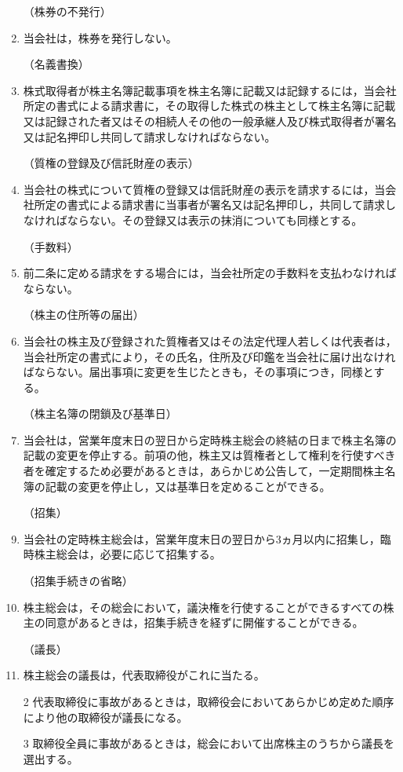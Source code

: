\documentclass[11pt,a4paper]{jsarticle}
\makeatletter
\def\section{\@startsection{section}{1}{-40pt}{15pt}{10pt}{\normalfont\Large\bfseries\centering}}
\newcommand{\header}[1]{\vspace{5pt}\hspace{-42pt}（{#1}）}
\makeatother
\begin{document}
\begin{enumerate}
\header{株券の不発行}
\item 当会社は，株券を発行しない。

\header{名義書換}
\item 株式取得者が株主名簿記載事項を株主名簿に記載又は記録するには，当会社所定の書式による請求書に，その取得した株式の株主として株主名簿に記載又は記録された者又はその相続人その他の一般承継人及び株式取得者が署名又は記名押印し共同して請求しなければならない。

\header{質権の登録及び信託財産の表示}
\item 当会社の株式について質権の登録又は信託財産の表示を請求するには，当会社所定の書式による請求書に当事者が署名又は記名押印し，共同して請求しなければならない。その登録又は表示の抹消についても同様とする。

\header{手数料}
\item 前二条に定める請求をする場合には，当会社所定の手数料を支払わなければならない。

\header{株主の住所等の届出}
\item 当会社の株主及び登録された質権者又はその法定代理人若しくは代表者は，当会社所定の書式により，その氏名，住所及び印鑑を当会社に届け出なければならない。届出事項に変更を生じたときも，その事項につき，同様とする。

\header{株主名簿の閉鎖及び基準日}
\item 当会社は，営業年度末日の翌日から定時株主総会の終結の日まで株主名簿の記載の変更を停止する。前項の他，株主又は質権者として権利を行使すべき者を確定するため必要があるときは，あらかじめ公告して，一定期間株主名簿の記載の変更を停止し，又は基準日を定めることができる。


\section{株主総会}


\item[]
\header{招集}
\item 当会社の定時株主総会は，営業年度末日の翌日から3ヵ月以内に招集し，臨時株主総会は，必要に応じて招集する。

\header{招集手続きの省略}
\item 株主総会は，その総会において，議決権を行使することができるすべての株主の同意があるときは，招集手続きを経ずに開催することができる。

\header{議長}
\item 株主総会の議長は，代表取締役がこれに当たる。
\item[2] 代表取締役に事故があるときは，取締役会においてあらかじめ定めた順序により他の取締役が議長になる。
\item[3] 取締役全員に事故があるときは，総会において出席株主のうちから議長を選出する。


\end{enumerate}
\end{document}
